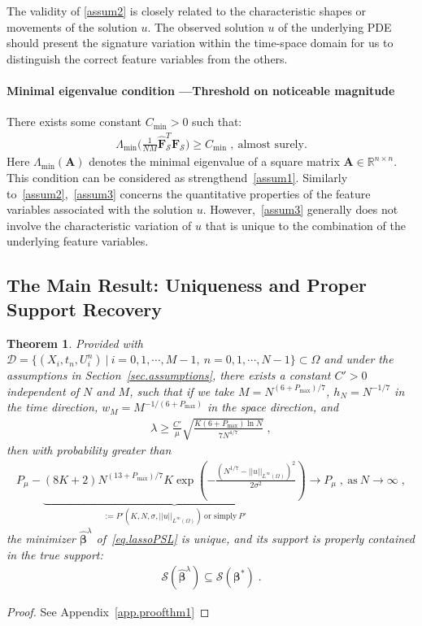 \documentclass[a4paper,11pt]{article}
\newcommand{\bbeta}{\bm{\beta}}
\newcommand{\bF}{\mathbf{F}}
\newcommand{\mS}{\mathcal{S}}
\newtheorem{thm}{Theorem}[section]
\theoremstyle{definition}
\begin{document}
The validity of \eqref{assum2} is closely related to the characteristic shapes or movements of the solution $u$. The observed solution $u$ of the underlying PDE should present the signature variation within the time-space domain for us to distinguish the correct feature variables from the others.
\paragraph{Minimal eigenvalue condition ---Threshold on noticeable magnitude} There exists some constant $C_{\min}>0$ such that:
\begin{align}
\Lambda_{\min}\Big(\frac{1}{NM}\widehat{\bF}_\mS^T\widehat{\bF}_\mS\Big)\geq C_{\min}\;,~\text{almost surely.}\label{assum3}\tag{A3}
\end{align}
Here $\Lambda_{\min}(\mathbf{A})$ denotes the minimal eigenvalue of a square matrix $\mathbf{A}\in\mathbb{R}^{n\times n}$. This condition can be considered as strengthend~\eqref{assum1}. Similarly to~\eqref{assum2},~\eqref{assum3} concerns the quantitative properties of the feature variables associated with the solution $u$. However,~\eqref{assum3} generally does not involve the characteristic variation of $u$ that is unique to the combination of the underlying feature variables.

\subsection{The Main Result: Uniqueness and Proper Support Recovery}\label{ssec:main}

\begin{thm}\label{thm1}
Provided with $\mathcal{D}=\{(X_i,t_n,U_i^n)~|~i=0,1,\cdots,M-1,~n=0,1,\cdots,N-1\}\subset\Omega$ and under the assumptions in Section~\ref{sec.assumptions}, there exists a constant $C'>0$ independent of $N$ and $M$, such that if we take $M = N^{(6+P_{\max})/7}$, $h_N=N^{-1/7}$ in the time direction, $w_{M} = M^{-1/(6+P_{\max})}$ in the space direction, and
\begin{align}
\lambda\geq \frac{C'}{\mu}\sqrt{\frac{K(6+P_{\max})\ln N}{7N^{4/7}}}\;,\label{lambdaBound}
\end{align}
then with probability greater than
\begin{align}
	P_\mu-\underbrace{(8K+2)N^{(13+P_{\max})/7}K\exp(-\frac{(N^{1/7}-||u||_{L^\infty(\Omega)})^2}{2\sigma^2})}_{:=P'(K,N,\sigma,||u||_{L^\infty(\Omega)})~\text{or simply}~P'}\longrightarrow P_\mu\;,~\text{as}~N\to\infty\;,\label{eq.probability}
\end{align}
the minimizer $\widehat{\bbeta}^\lambda$ of~\eqref{eq.lassoPSL} is unique, and its support is properly contained in the true support:
\begin{align*}
\mS(\widehat{\bbeta}^\lambda)\subseteq\mS(\bbeta^*)\;.
\end{align*}	
\end{thm}
\begin{proof}
See Appendix~\ref{app.proofthm1}	
\end{proof}
\end{document}
